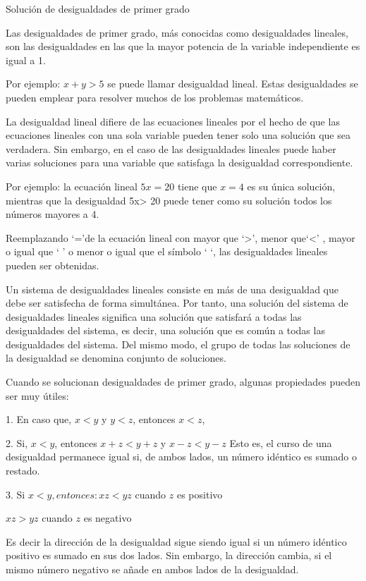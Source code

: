 \documentclass[oneside,spanish,letterpaper]{extbook}
\theoremstyle{mythmstyle}
\begin{document}
Solución de desigualdades de primer grado

Las desigualdades de primer grado, más conocidas como desigualdades lineales, son las desigualdades en 
las que la mayor potencia de la variable independiente es igual a 1.

Por ejemplo: $x + y> 5$ se puede llamar desigualdad lineal. Estas desigualdades se pueden emplear para
resolver muchos de los problemas matemáticos.

La desigualdad lineal difiere de las ecuaciones lineales por el hecho de que las ecuaciones lineales
con una sola variable pueden tener solo una solución que sea verdadera. Sin embargo, en el caso de las
desigualdades lineales puede haber varias soluciones para una variable que satisfaga la desigualdad
correspondiente.

Por ejemplo: la ecuación lineal $5x = 20$ tiene que $x = 4$ es su única solución, mientras que
la desigualdad 5x> 20 puede tener como su solución todos los números mayores a 4.

Reemplazando ‘=’de la ecuación lineal con mayor que ‘>’, menor que‘<’ , mayor o igual que ‘ ’ o menor o igual
que el símbolo ‘ ‘, las desigualdades lineales pueden ser obtenidas.

Un sistema de desigualdades lineales consiste en más de una desigualdad que debe ser satisfecha
de forma simultánea. Por tanto, una solución del sistema de desigualdades lineales significa una solución
que satisfará a todas las desigualdades del sistema, es decir, una solución que es común a todas las
desigualdades del sistema. Del mismo modo, el grupo de todas las soluciones de la desigualdad se denomina
conjunto de soluciones.

Cuando se solucionan desigualdades de primer grado, algunas propiedades pueden ser muy útiles:

1. En caso que, $x < y$ y $y < z$, entonces $x < z$,

2. Si, $x < y$, entonces $x + z < y + z$ y $x - z < y - z$ Esto es, el curso de una desigualdad permanece igual
si, de ambos lados, un número idéntico es sumado o restado.

3. Si $x < y, entonces: xz < yz$ cuando $z$ es positivo

                               $xz > yz$ cuando $z$ es negativo 

Es decir la dirección de la desigualdad sigue siendo igual si un número idéntico positivo es
sumado en sus dos lados. Sin embargo, la dirección cambia, si el mismo número negativo se añade en ambos lados de
la desigualdad.
\end{document}
